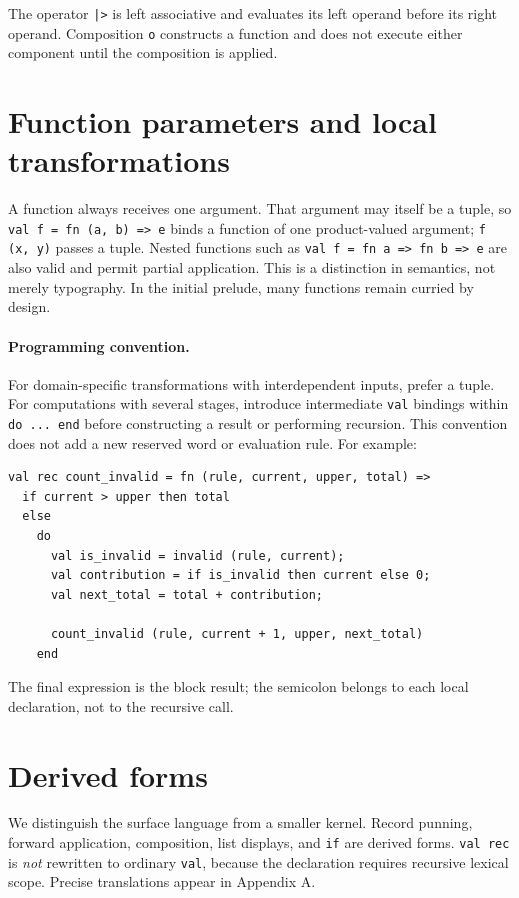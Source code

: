 \documentclass[11pt,oneside,openany]{book}
\newcommand{\kw}[1]{\texttt{#1}}
\begin{document}
The operator \kw{|>} is left associative and evaluates its left operand before its right operand. Composition \kw{o} constructs a function and does not execute either component until the composition is applied.

\section{Function parameters and local transformations}
A function always receives one argument. That argument may itself be a tuple, so
\kw{val f = fn (a, b) => e} binds a function of one product-valued argument;
\kw{f (x, y)} passes a tuple. Nested functions such as
\kw{val f = fn a => fn b => e} are also valid and permit partial application.
This is a distinction in semantics, not merely typography. In the initial
prelude, many functions remain curried by design.

\paragraph{Programming convention.} For domain-specific transformations with
interdependent inputs, prefer a tuple. For computations with several stages,
introduce intermediate \kw{val} bindings within \kw{do ... end} before
constructing a result or performing recursion. This convention does not add a
new reserved word or evaluation rule. For example:
\begin{lstlisting}
val rec count_invalid = fn (rule, current, upper, total) =>
  if current > upper then total
  else
    do
      val is_invalid = invalid (rule, current);
      val contribution = if is_invalid then current else 0;
      val next_total = total + contribution;

      count_invalid (rule, current + 1, upper, next_total)
    end
\end{lstlisting}
The final expression is the block result; the semicolon belongs to each local
declaration, not to the recursive call.

\section{Derived forms}
We distinguish the surface language from a smaller kernel. Record punning, forward application, composition, list displays, and \kw{if} are derived forms. \kw{val rec} is \emph{not} rewritten to ordinary \kw{val}, because the declaration requires recursive lexical scope. Precise translations appear in Appendix A.
\end{document}
